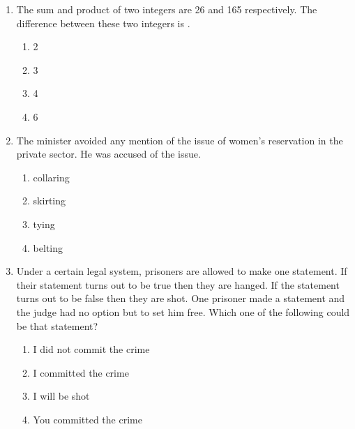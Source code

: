 \documentclass[journal,12pt,onecolumn]{IEEEtran}
\theoremstyle{remark}
\begin{document}
\begin{enumerate}
\item The sum and product of two integers are 26 and 165 respectively. The difference between these two integers is \underline{\hspace{1.5cm}}.  \hfill{}
\begin{multicols}{4}
\begin{enumerate}
    \item 2
    \item 3
    \item 4
    \item 6
\end{enumerate}
\end{multicols}

\item The minister avoided any mention of the issue of women's reservation in the private sector. He was accused of \underline{\hspace{2cm}} the issue.  \hfill{}
\begin{multicols}{4}
\begin{enumerate}
    \item collaring
    \item skirting
    \item tying
    \item belting
\end{enumerate}
\end{multicols}

\item Under a certain legal system, prisoners are allowed to make one statement. If their statement turns out to be true then they are hanged. If the statement turns out to be false then they are shot. One prisoner made a statement and the judge had no option but to set him free. Which one of the following could be that statement?  \hfill{}
\begin{multicols}{4}
\begin{enumerate}
    \item I did not commit the crime
    \item I committed the crime
    \item I will be shot
    \item You committed the crime
\end{enumerate}
\end{multicols}






\end{enumerate}
\end{document}
